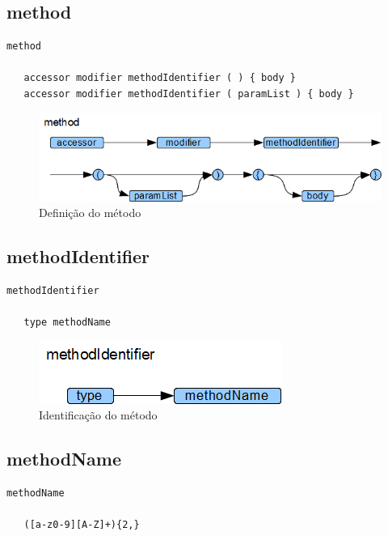 \subsection{method}

\begin{lstlisting}
method

   accessor modifier methodIdentifier ( ) { body }
   accessor modifier methodIdentifier ( paramList ) { body }

\end{lstlisting}

\begin{figure}[h!]
 \centering
 \includegraphics[scale=0.7]{capitulo09/method.png}
 \caption{Definição do método}
\end{figure}
\subsection{methodIdentifier}

\begin{lstlisting}
methodIdentifier

   type methodName

\end{lstlisting}

\begin{figure}[h!]
 \centering
 \includegraphics{capitulo09/methodIdentifier.png}
 \caption{Identificação do método}
\end{figure}
\subsection{methodName}

\begin{lstlisting}
methodName

   ([a-z0-9][A-Z]+){2,}

\end{lstlisting}

